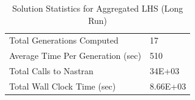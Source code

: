 \begin{table}[!htbp]
  \centering
\caption{Solution Statistics for Aggregated LHS (Long Run)}
  \label{tab:stat_agg_long}
  \begin{tabular}{|l|l|}
    \hline
	  Total Generations Computed & 17\\
    Average Time Per Generation (sec) & 510\\
    Total Calls to Nastran & 34E+03\\
    Total Wall Clock Time (sec)	 & 8.66E+03\\
    \hline
  \end{tabular}
\end{table} 

